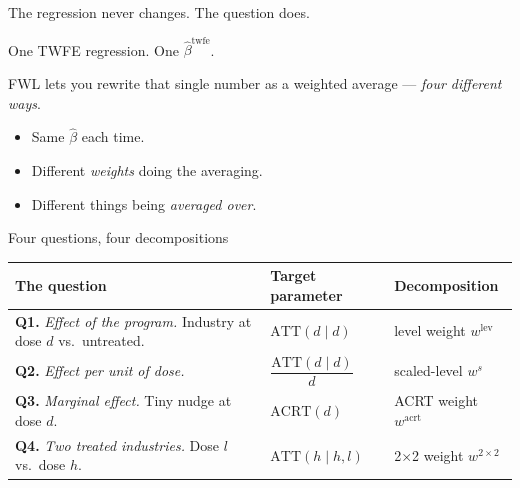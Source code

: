 \documentclass[aspectratio=169,12pt,t]{beamer}
\begin{document}
\begin{frame}{The regression never changes. \;The question does.}
\vspace{0.4em}

One TWFE regression. \;One $\widehat\beta^{\text{twfe}}$.

\vspace{0.9em}

FWL lets you rewrite that single number as a weighted average --- \textit{four different ways}.

\vspace{0.9em}

\begin{itemize}\setlength\itemsep{0.4em}
  \item Same $\widehat\beta$ each time.
  \item Different \textit{weights} doing the averaging.
  \item Different things being \textit{averaged over}.
\end{itemize}

\vspace{0.7em}

\begin{center}
\end{center}
\end{frame}

\begin{frame}{Four questions, four decompositions}
\vspace{0.2em}
\footnotesize
\begin{center}
\renewcommand{\arraystretch}{1.55}
\begin{tabular}{p{} p{} p{}}
\toprule
\textbf{The question} & \textbf{Target parameter} & \textbf{Decomposition} \\
\midrule
\textbf{Q1.} \;\textit{Effect of the program.} \;Industry at dose $d$ vs.\ untreated. & $\text{ATT}(d \mid d)$ & level weight $w^{\text{lev}}$ \\
\textbf{Q2.} \;\textit{Effect per unit of dose.} & $\dfrac{\text{ATT}(d \mid d)}{d}$ & scaled-level $w^{s}$ \\
\textbf{Q3.} \;\textit{Marginal effect.} \;Tiny nudge at dose $d$. & $\text{ACRT}(d)$ & ACRT weight $w^{\text{acrt}}$ \\
\textbf{Q4.} \;\textit{Two treated industries.} \;Dose $l$ vs.\ dose $h$. & $\text{ATT}(h \mid h, l)$ & 2$\times$2 weight $w^{2\times 2}$ \\
\bottomrule
\end{tabular}
\end{center}

\vspace{0.5em}

\begin{center}
\end{center}
\end{frame}
\end{document}
